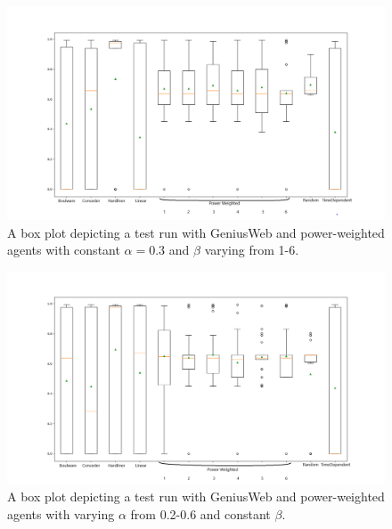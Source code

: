             
            \begin{figure}[H]
                \centering
                \includegraphics[width=15cm]{figures/Power factor test.png}
                \caption{A box plot depicting a test run with GeniusWeb and power-weighted agents with constant $\alpha = 0.3$ and $\beta$ varying from 1-6.}
                \label{fig:power_factor}
            \end{figure}
            
            
            
            \begin{figure}[H]
                \centering
                \includegraphics[width=15cm]{figures/Power-Time.png}
                \caption{A box plot depicting a test run with GeniusWeb and power-weighted agents with varying $\alpha$ from 0.2-0.6 and constant $\beta$.}
                \label{fig:power_time}
            \end{figure}